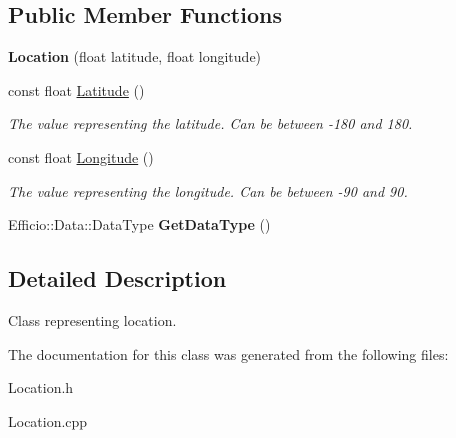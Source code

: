 \subsection*{Public Member Functions}
\begin{DoxyCompactItemize}
\item 
{\bfseries Location} (float latitude, float longitude)\hypertarget{class_efficio_1_1_data_1_1_positional_1_1_location_a7d395198841fde2ebde8313000c1b7f5}{}\label{class_efficio_1_1_data_1_1_positional_1_1_location_a7d395198841fde2ebde8313000c1b7f5}

\item 
const float \hyperlink{class_efficio_1_1_data_1_1_positional_1_1_location_a0d1baa0fd7a87d289239a4c85125a227}{Latitude} ()\hypertarget{class_efficio_1_1_data_1_1_positional_1_1_location_a0d1baa0fd7a87d289239a4c85125a227}{}\label{class_efficio_1_1_data_1_1_positional_1_1_location_a0d1baa0fd7a87d289239a4c85125a227}

\begin{DoxyCompactList}\small\item\em The value representing the latitude. Can be between -\/180 and 180. \end{DoxyCompactList}\item 
const float \hyperlink{class_efficio_1_1_data_1_1_positional_1_1_location_a92ccf5403c541f0e9c612b11532a2d95}{Longitude} ()\hypertarget{class_efficio_1_1_data_1_1_positional_1_1_location_a92ccf5403c541f0e9c612b11532a2d95}{}\label{class_efficio_1_1_data_1_1_positional_1_1_location_a92ccf5403c541f0e9c612b11532a2d95}

\begin{DoxyCompactList}\small\item\em The value representing the longitude. Can be between -\/90 and 90. \end{DoxyCompactList}\item 
Efficio\+::\+Data\+::\+Data\+Type {\bfseries Get\+Data\+Type} ()\hypertarget{class_efficio_1_1_data_1_1_positional_1_1_location_a89345d49425cabbbbc4d59f7c5698d1a}{}\label{class_efficio_1_1_data_1_1_positional_1_1_location_a89345d49425cabbbbc4d59f7c5698d1a}

\end{DoxyCompactItemize}


\subsection{Detailed Description}
Class representing location. 

The documentation for this class was generated from the following files\+:\begin{DoxyCompactItemize}
\item 
Location.\+h\item 
Location.\+cpp\end{DoxyCompactItemize}
